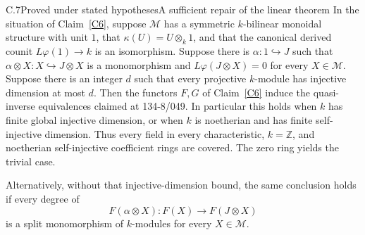 \begin{claim}{C.7}{Proved under stated hypotheses}{A sufficient repair of the linear theorem}\label{C7}
In the situation of Claim~\ref{C6}, suppose $\mathcal M$ has a symmetric $k$-bilinear monoidal structure with unit $1$, that $\kappa(U)=U\otimes_k1$, and that the canonical derived counit $L\varphi(1)\to k$ is an isomorphism. Suppose there is $\alpha:1\hookrightarrow J$ such that $\alpha\otimes X:X\hookrightarrow J\otimes X$ is a monomorphism and $L\varphi(J\otimes X)=0$ for every $X\in\mathcal M$. Suppose there is an integer $d$ such that every projective $k$-module has injective dimension at most $d$. Then the functors $F,G$ of Claim~\ref{C6} induce the quasi-inverse equivalences claimed at 134-8/049. In particular this holds when $k$ has finite global injective dimension, or when $k$ is noetherian and has finite self-injective dimension. Thus every field in every characteristic, $k=\mathbb Z$, and noetherian self-injective coefficient rings are covered. The zero ring yields the trivial case.

Alternatively, without that injective-dimension bound, the same conclusion holds if every degree of
\[
 F(\alpha\otimes X):F(X)\longrightarrow F(J\otimes X)
\]
is a split monomorphism of $k$-modules for every $X\in\mathcal M$.
\end{claim}
